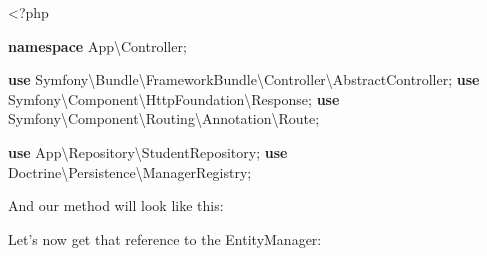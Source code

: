 \documentclass[a4paperpaper,openright]{book}
\newenvironment{Shaded}{}{}
\newcommand{\CommentTok}[1]{\textcolor[rgb]{0.38,0.63,0.69}{\textit{#1}}}
\newcommand{\KeywordTok}[1]{\textcolor[rgb]{0.00,0.44,0.13}{\textbf{#1}}}
\newcommand{\NormalTok}[1]{#1}
\newcommand{\OtherTok}[1]{\textcolor[rgb]{0.00,0.44,0.13}{#1}}
\begin{document}
\begin{Shaded}
\begin{Highlighting}[]
\NormalTok{   <}\OtherTok{?}\NormalTok{php}
   
   \KeywordTok{namespace}\NormalTok{ App\textbackslash{}Controller}\OtherTok{;}
   
   \KeywordTok{use}\NormalTok{ Symfony\textbackslash{}Bundle\textbackslash{}FrameworkBundle\textbackslash{}Controller\textbackslash{}AbstractController}\OtherTok{;}
   \KeywordTok{use}\NormalTok{ Symfony\textbackslash{}Component\textbackslash{}HttpFoundation\textbackslash{}Response}\OtherTok{;}
   \KeywordTok{use}\NormalTok{ Symfony\textbackslash{}Component\textbackslash{}Routing\textbackslash{}Annotation\textbackslash{}Route}\OtherTok{;}
   
   \KeywordTok{use}\NormalTok{ App\textbackslash{}Repository\textbackslash{}StudentRepository}\OtherTok{;}  
   \KeywordTok{use}\NormalTok{ Doctrine\textbackslash{}Persistence\textbackslash{}ManagerRegistry}\OtherTok{;}
\end{Highlighting}
\end{Shaded}

And our method will look like this:

\begin{Shaded}
\end{Shaded}

Let's now get that reference to the EntityManager:

\begin{Shaded}
\end{Shaded}
\end{document}
